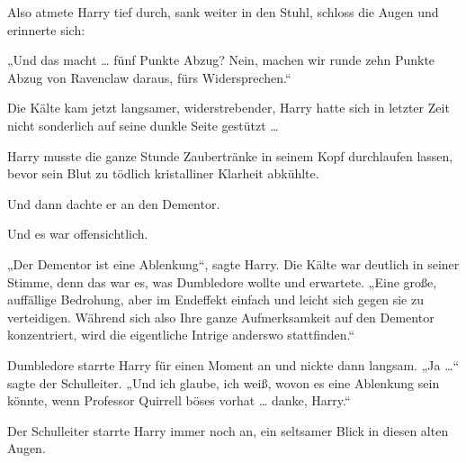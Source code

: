 Also atmete Harry tief durch, sank weiter in den Stuhl, schloss die Augen und erinnerte sich:

„Und das macht … fünf Punkte Abzug? Nein, machen wir runde zehn Punkte Abzug von Ravenclaw daraus, fürs Widersprechen.“

Die Kälte kam jetzt langsamer, widerstrebender, Harry hatte sich in letzter Zeit nicht sonderlich auf seine dunkle Seite gestützt …

Harry musste die ganze Stunde Zaubertränke in seinem Kopf durchlaufen lassen, bevor sein Blut zu tödlich kristalliner Klarheit abkühlte.

Und dann dachte er an den Dementor.

Und es war offensichtlich.

„Der Dementor ist eine Ablenkung“, sagte Harry. Die Kälte war deutlich in seiner Stimme, denn das war es, was Dumbledore wollte und erwartete.
„Eine große, auffällige Bedrohung, aber im Endeffekt einfach und leicht sich gegen sie zu verteidigen. Während sich also Ihre ganze Aufmerksamkeit auf den Dementor konzentriert, wird die eigentliche Intrige anderswo stattfinden.“

Dumbledore starrte Harry für einen Moment an und nickte dann langsam.
„Ja …“ sagte der Schulleiter.
„Und ich glaube, ich weiß, wovon es eine Ablenkung sein könnte, wenn Professor Quirrell böses vorhat … danke, Harry.“

Der Schulleiter starrte Harry immer noch an, ein seltsamer Blick in diesen alten Augen.

